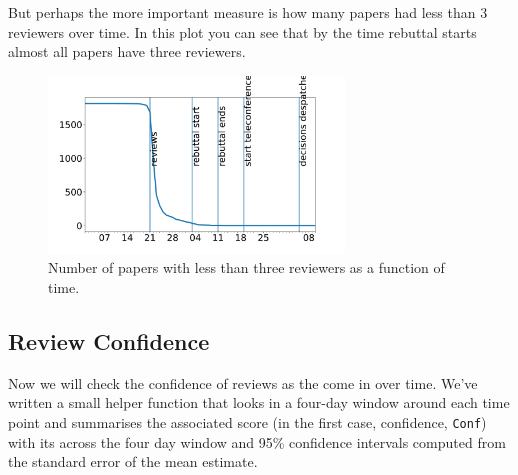 But perhaps the more important measure is how many papers had less than
3 reviewers over time. In this plot you can see that by the time
rebuttal starts almost all papers have three reviewers.

\begin{Shaded}
\begin{Highlighting}[]
\OperatorTok{=}\OperatorTok{=}
\OperatorTok{=}\OperatorTok{\textless{}}\NormalTok{()}
\end{Highlighting}
\end{Shaded}

\begin{figure}[htb]
\includegraphics[width=0.70\textwidth]{diagrams/neurips/paper-short-reviews.pdf}


\caption{Number of papers with less than three reviewers as a function of time.}
\label{paper-short-reviews}
\end{figure}

\hypertarget{review-confidence}{%
\subsection{Review Confidence}\label{review-confidence}}

Now we will check the confidence of reviews as the come in over time.
We've written a small helper function that looks in a four-day window
around each time point and summarises the associated score (in the first
case, confidence, \texttt{Conf}) with its across the four day window and
95\% confidence intervals computed from the standard error of the mean
estimate.

